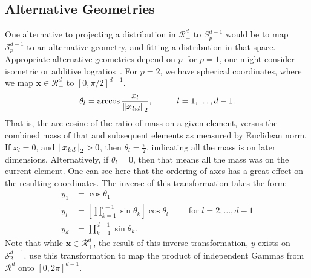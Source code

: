 \subsection{Alternative Geometries}
One alternative to projecting a distribution in $\mathcal{R}_+^d$ to $S_{p}^{d-1}$ would be to map
  $\mathcal{S}_{p}^{d-1}$ to an alternative geometry, and fitting a distribution in that space.
  Appropriate alternative geometries depend on $p$--for $p = 1$, one might consider isometric or
  additive logratios~\citep{aitchison1982}.  For $p = 2$, we have spherical coordinates, where we
  map $\bm{x}\in\mathcal{R}_+^d$ to $[0,\pi/2]^{d-1}$.
  \begin{equation*}
      \theta_l = \arccos\frac{x_l}{\left\lVert \bm{x}_{l:d} \right\rVert_{2}},\hspace{1cm}l = 1,\ldots,d-1.
  \end{equation*}
  That is, the arc-cosine of the ratio of mass on a given element, versus the combined mass of that
  and subsequent elements as measured by Euclidean norm.  If $x_l = 0$, and $\left\lVert \bm{x}_{l:d} \right\rVert_{2} > 0$,
  then $\theta_l = \frac{\pi}{2}$, indicating all the mass is on later dimensions.  Alternatively, if
  $\theta_l = 0$, then that means all the mass was on the current element.  One can see here that the
  ordering of axes has a great effect on the resulting coordinates.  The inverse of this transformation
  takes the form:
  \begin{equation}
    \label{eqn:spherical}
    \begin{aligned}
      y_1 &= \cos\theta_1\\
      y_l &= \left[\prod_{k = 1}^{l-1}\sin\theta_k\right]\cos\theta_l \hspace{1cm}\text{for } l = 2,\ldots,d-1\\
      y_d &= \prod_{k = 1}^{d-1}\sin\theta_k.
    \end{aligned}
  \end{equation}
  Note that while $\bm{x}\in \mathcal{R}_+^d$, the result of this inverse transformation,
  $y$ exists on $\mathcal{S}_2^{d-1}$. \cite{nunez2019} use this transformation to map the product
  of independent Gammas from $\mathcal{R}^d$ onto $[0,2\pi]^{d-1}$.

